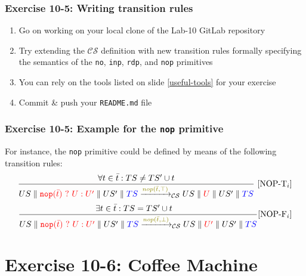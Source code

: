 \documentclass[presentation]{beamer}\mode<presentation>{\usetheme{AMSCesenaPurpleAndGold}}
\begin{document}
\begin{frame}
\frametitle{Exercise 10-5: Writing transition rules}

    \begin{enumerate}
    \item Go on working on your local clone of the Lab-10 GitLab repository
        
        \vfill
        
        \item Try extending the $\mathcal{CS}$ definition with new transition rules formally specifying the semantics of the \texttt{no}, \texttt{inp}, \texttt{rdp}, and \texttt{nop} primitives 
        
        \vfill
        
        \item You can rely on the tools listed on slide \ref{useful-tools} for your exercise
        
        \vfill
        
        \item Commit \& push your \texttt{README.md} file
        
    \end{enumerate}

\end{frame}

\begin{frame}
\frametitle{Exercise 10-5: Example for the \texttt{nop} primitive}

    For instance, the \texttt{nop} primitive could be defined by means of the following transition rules:
    \[
		\frac{
			\forall t \in \bar{t} : TS \neq TS' \cup t
		}{
			US \parallel \highlightR{\mathtt{nop}(\bar t)\ ?\ U : U'} \parallel US' \parallel \highlightB{TS}
			\xrightarrow{\highlightG{nop(\bar t, \top)}}_\mathcal{CS}
			US \parallel \highlightR{U} \parallel US' \parallel \highlightB{TS}
		} 
		~[\text{NOP-T}_i]
	\]
    \[
		\frac{
			\exists t \in \bar{t} : TS = TS' \cup t \quad 
		}{
			US \parallel \highlightR{\mathtt{nop}(\bar t)\ ?\ U : U'} \parallel US' \parallel \highlightB{TS}
			\xrightarrow{\highlightG{nop(\bar t, \bot)}}_\mathcal{CS}
			US \parallel \highlightR{U'} \parallel US' \parallel \highlightB{TS}
		} 
		[\text{NOP-F}_i]
	\]

\end{frame}

\section{Exercise 10-6: Coffee Machine}
\end{document}
